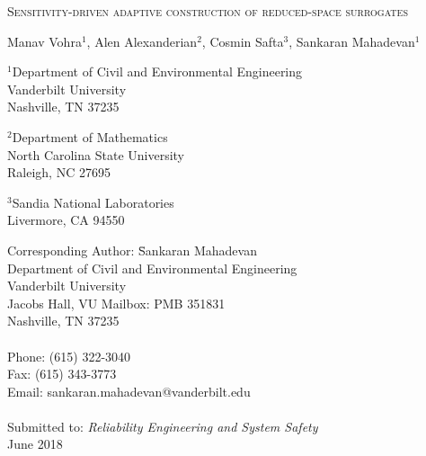 \begin{center}
\textsc{
Sensitivity-driven adaptive construction of reduced-space surrogates
}

\bigskip 
\bigskip 

Manav Vohra$^{1}$, Alen Alexanderian$^{2}$, Cosmin Safta$^{3}$, Sankaran Mahadevan$^{1}$

\bigskip
\bigskip

\normalsize
$^1$Department of Civil and Environmental Engineering\\
Vanderbilt University\\
Nashville, TN 37235\\

\bigskip

$^2$Department of Mathematics\\
North Carolina State University\\
Raleigh, NC 27695\\

\bigskip

$^3$Sandia National Laboratories\\
Livermore, CA 94550\\

\end{center}

\vspace{6cm}

\begin{tabbing}
Corresponding Author: \hspace{5mm} \= Sankaran Mahadevan\\
       \>  Department of Civil and Environmental Engineering\\
       \>  Vanderbilt University\\
        Jacobs Hall, VU Mailbox: PMB 351831 \\
       \>  Nashville, TN 37235 \\
       \> \\
Phone: \> (615) 322-3040 \\
Fax:   \> (615) 343-3773 \\
Email: \>  sankaran.mahadevan@vanderbilt.edu   \\
\\
Submitted to: \> \textit{Reliability Engineering and System Safety} \\
\>  June 2018\\

\bigskip
\end{tabbing}

\clearpage

